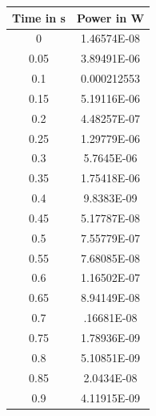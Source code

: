 \begin{minipage}{0.5\textwidth}
    \center
        \begin{tabular}{|c|c|}
            \hline
            Time in s & Power in W \\
            \hline
            0 & 1.46574E-08\\
            \hline
            0.05 & 3.89491E-06\\
            \hline
            0.1	& 0.000212553\\
            \hline
            0.15 & 5.19116E-06\\
            \hline
            0.2	& 4.48257E-07\\
            \hline
            0.25 & 1.29779E-06\\
            \hline
            0.3	& 5.7645E-06\\
            \hline
            0.35 & 1.75418E-06\\
            \hline
            0.4	& 9.8383E-09\\
            \hline
            0.45 & 5.17787E-08\\
            \hline
            0.5	& 7.55779E-07\\
            \hline
            0.55 & 7.68085E-08\\
            \hline
            0.6	& 1.16502E-07\\
            \hline
            0.65 & 8.94149E-08\\
            \hline
            0.7	& .16681E-08\\
            \hline
            0.75 & 1.78936E-09\\
            \hline
            0.8	& 5.10851E-09\\
            \hline
            0.85 & 2.0434E-08\\
            \hline
            0.9	& 4.11915E-09\\
            \hline
        \end{tabular}
        \label{Tab:Values of Power Graph 1}    
\end{minipage}
